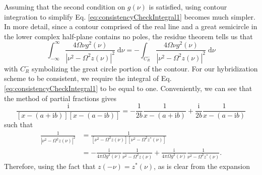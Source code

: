 \documentclass{article}
\begin{document}
Assuming that the second condition on $g(\nu)$ is satisfied, using contour integration to simplify Eq. \eqref{eq:consistencyCheckIntegral1} becomes much simpler. In more detail, since a contour comprised of the real line and a great semicircle in the lower complex half-plane contains no poles, the residue theorem tells us that
\begin{equation}
\int_{-\infty}^\infty\frac{4\Omega\nu g^2(\nu)}{|\nu^2 - \Omega ^2z(\nu)|^2}\;\mathrm{d}\nu = -\int_{C_R^-}\frac{4\Omega\nu g^2(\nu)}{|\nu^2 - \Omega ^2z(\nu)|^2}\;\mathrm{d}\nu
\end{equation}
with $C_R^-$ symbolizing the great circle portion of the contour. For our hybridization scheme to be consistent, we require the integral of Eq. \eqref{eq:consistencyCheckIntegral1} to be equal to one. Conveniently, we can see that the method of partial fractions gives
\begin{equation}
\frac{\mathrm{i}}{[x - (a + \mathrm{i}b)][x - (a - \mathrm{i}b)]} = -\frac{1}{2b}\frac{1}{x - (a + \mathrm{i}b)} + \frac{\mathrm{i}}{2b}\frac{1}{x - (a - \mathrm{i}b)}
\end{equation}
such that
\begin{equation}
\begin{split}
\frac{1}{|\nu^2 - \Omega^2z(\nu)|^2} &= \frac{1}{[\nu^2 - \Omega^2z(\nu)][\nu^2 - \Omega^2z^*(\nu)]}\\
& = -\frac{\mathrm{i}}{4\pi\Omega g^2(\nu)}\frac{1}{\nu^2 - \Omega^2z(\nu)} + \frac{\mathrm{i}}{4\pi\Omega g^2(\nu)}\frac{1}{\nu^2 - \Omega^2z^*(\nu)}.
\end{split}
\end{equation}
Therefore, using the fact that $z(-\nu) = z^*(\nu)$, as is clear from the expansion
\end{document}
